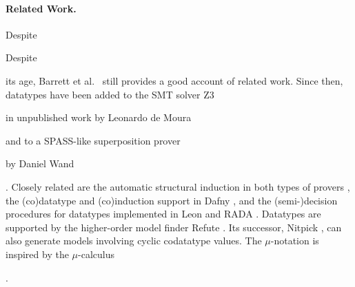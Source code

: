 \begin{rep}\paragraph{Related Work.} Despite\end{rep}%
\begin{conf}Despite\end{conf} its age,
Barrett et al.\ \cite{barrett-et-al-2007} still provides a good account of
related work. Since then, datatypes have been added to the SMT solver
Z3 \cite{de-moura-bjoerner-2008} \begin{rep}in unpublished work by Leonardo de Moura \end{rep}and to a SPASS-like %
superposition prover \begin{rep}by Daniel Wand\end{rep} \cite{wand-2014}.
Closely related are the automatic structural
induction in both types of provers \cite{kersani-peltier-2013,cruanes-201x,wand-weidenbach-201x,reynolds-kuncak-2015},
the (co)datatype and (co)induction support in Dafny \cite{leino-moskal-2014},
and the (semi-)decision procedures for datatypes
implemented in Leon \cite{suter-et-al-2011} and RADA \cite{pham-et-al-2013}.
%
Datatypes are supported by the higher-order model finder Refute
\cite{weber-2008}. Its successor, Nitpick \cite{blanchette-nipkow-2010}, can
also generate models involving cyclic codatatype values. The $\mu$-notation is
inspired by the $\mu$-calculus
\begin{conf}\cite{kozen-1983}\end{conf}%
\begin{rep}\cite[etc.]{kozen-1983,endrullis-et-al-2011}\end{rep}.


%

